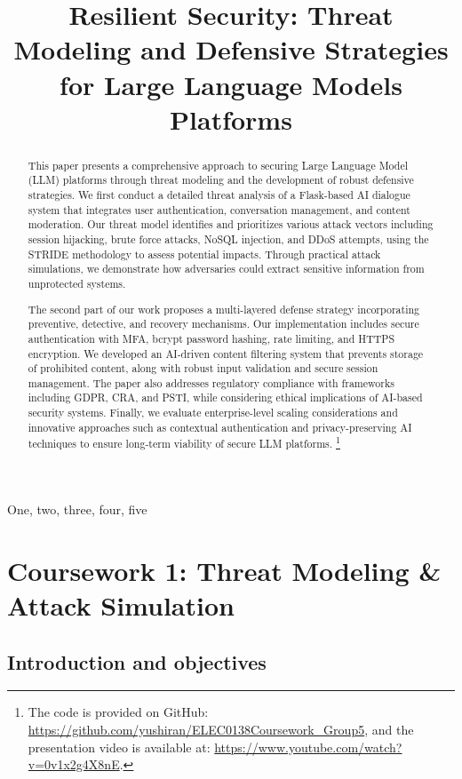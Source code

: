 \documentclass{article}
\title{Resilient Security: Threat Modeling and Defensive Strategies for Large Language Models Platforms}
\begin{document}
%
\maketitle
%
\begin{abstract}
    This paper presents a comprehensive approach to securing Large Language Model (LLM) platforms through threat modeling and the development of robust defensive strategies. We first conduct a detailed threat analysis of a Flask-based AI dialogue system that integrates user authentication, conversation management, and content moderation. Our threat model identifies and prioritizes various attack vectors including session hijacking, brute force attacks, NoSQL injection, and DDoS attempts, using the STRIDE methodology to assess potential impacts. Through practical attack simulations, we demonstrate how adversaries could extract sensitive information from unprotected systems.

    The second part of our work proposes a multi-layered defense strategy incorporating preventive, detective, and recovery mechanisms. Our implementation includes secure authentication with MFA, bcrypt password hashing, rate limiting, and HTTPS encryption. We developed an AI-driven content filtering system that prevents storage of prohibited content, along with robust input validation and secure session management. The paper also addresses regulatory compliance with frameworks including GDPR, CRA, and PSTI, while considering ethical implications of AI-based security systems. Finally, we evaluate enterprise-level scaling considerations and innovative approaches such as contextual authentication and privacy-preserving AI techniques to ensure long-term viability of secure LLM platforms.
    \footnote{The code is provided on GitHub: \url{https://github.com/yushiran/ELEC0138Coursework\_Group5}, and the presentation video is available at: \url{https://www.youtube.com/watch?v=0v1x2g4X8nE}.}
\end{abstract}
%
\begin{keywords}
    One, two, three, four, five
\end{keywords}


%

\section{Coursework 1: Threat Modeling \& Attack Simulation}
\subsection{Introduction and objectives}
\end{document}
